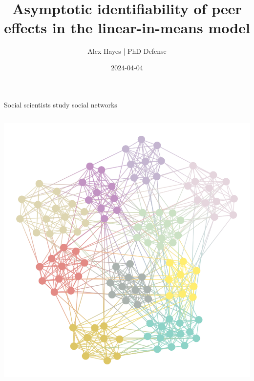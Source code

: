 \documentclass[aspectratio=169]{beamer}
\title{Asymptotic identifiability of peer effects in the linear-in-means model}
\date{2024-04-04}
\author{Alex Hayes | PhD Defense}
\institute{Department of Statistics, University of Wisconsin-Madison}
\theoremstyle{remark}
\begin{document}
\maketitle


\begin{frame}{Social scientists study social networks}
    \begin{columns}
        \centering
        \includegraphics[width=\textwidth]{./assortative.png}
\end{columns}
\end{frame}
\end{document}
